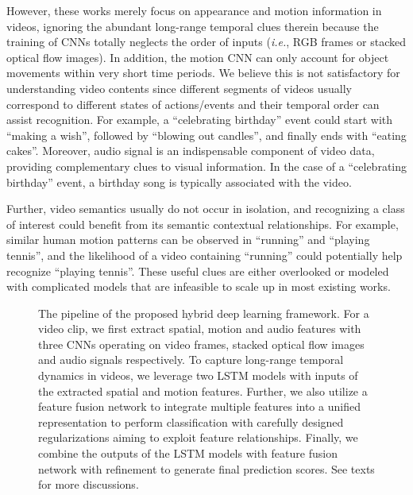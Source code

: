 \documentclass[journal]{IEEEtran}
\makeatletter
\newcommand*{\ie}{\emph{i.e.}\@\xspace}
\makeatother
\begin{document}
However, these works merely focus on appearance and motion information in videos, ignoring the abundant long-range temporal clues therein because the training of CNNs totally neglects the order of inputs (\ie, RGB frames or stacked optical flow images). In addition, the motion CNN can only account for object movements within very short time periods. We believe this is not satisfactory for understanding video contents since different segments of videos usually correspond to different states of actions/events and their temporal order can assist recognition. For example, a ``celebrating birthday'' event could start with ``making a wish'', followed by ``blowing out candles'', and finally ends with ``eating cakes''. Moreover, audio signal is an indispensable component of video data, providing complementary clues to visual information. In the case of a ``celebrating birthday'' event, a birthday song is typically associated with the video.

Further, video semantics usually do not occur in isolation, and recognizing a class of interest could benefit from its semantic contextual relationships. For example, similar human motion patterns can be observed  in ``running'' and ``playing tennis'', and the likelihood of a video containing ``running'' could potentially help recognize ``playing tennis''. These useful clues are either overlooked or modeled with complicated models that are infeasible to scale up in most existing works. 




\begin{figure*}
\centering
{}
\caption{\label{fig:framework} The pipeline of the proposed hybrid deep learning framework. For a video clip, we first extract spatial, motion and audio features with three CNNs operating on video frames, stacked optical flow images and audio signals respectively. To capture long-range temporal dynamics in videos, we leverage two LSTM models with inputs of the extracted spatial and motion features. Further, we also utilize a feature fusion network to integrate multiple features into a unified representation to perform classification with carefully designed regularizations aiming to exploit feature relationships. Finally, we combine the outputs of the LSTM models with feature fusion network with refinement to generate final prediction scores. See texts for more discussions.}
\end{figure*}
\end{document}
